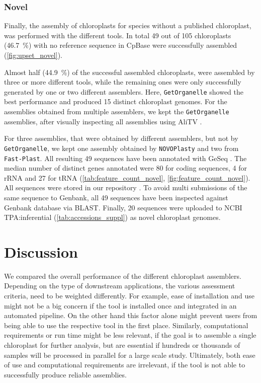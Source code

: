\documentclass{bmcart}
\newcommand{\formatprogramnames}[1]{\texttt{#1}}
\newcommand{\fp}{\formatprogramnames{Fast-Plast}}
\newcommand{\np}{\formatprogramnames{NOVOPlasty}}
\newcommand{\go}{\formatprogramnames{GetOrganelle}}
\newcommand{\zenodorepo}{\cite{zenodorepo}}
\begin{document}
\subsubsection*{Novel}
Finally, the assembly of chloroplasts for species without a published chloroplast, was performed with the different tools.
In total \num{49} out of \num{105} chloroplasts (\SI{46.7}{\percent}) with no reference sequence in CpBase were successfully assembled (\cref{fig:upset_novel}).

Almost half (\SI{44.9}{\percent}) of the successful assembled chloroplasts, were assembled by three or more different tools, while the remaining ones were only successfully generated by one or two different assemblers. 
Here, \go{} showed the best performance and produced 15 distinct chloroplast genomes. 
For the assemblies obtained from multiple assemblers, we kept the \go{} assemblies,
after visually inspecting all assemblies using AliTV \cite{alitv}.

For three assemblies, that were obtained by different assemblers, but not by \go{}, we kept one assembly obtained by \np{} and two from \fp{}.
All resulting \num{49} sequences have been annotated with GeSeq \cite{geseq}. 
The median number of distinct genes annotated were 80 for coding sequences, 4 for rRNA and 27 for tRNA (\cref{tab:feature_count_novel}, \cref{fig:feature_count_novel}). 
All sequences were stored in our repository \zenodorepo{}.
To avoid multi submissions of the same sequence to Genbank, all \num{49} sequences have been inspected against Genbank database via BLAST.
Finally, \num{20} sequences were uploaded to NCBI TPA:inferential (\cref{tab:accessions_suppl}) as novel chloroplast genomes.

\section*{Discussion}
We compared the overall performance of the different chloroplast assemblers.
Depending on the type of downstream applications, the various assessment criteria, need to be weighted differently.
For example, ease of installation and use might not be a big concern if the tool is installed once and integrated in an automated pipeline.
On the other hand this factor alone might prevent users from being able to use the respective tool in the first place.
Similarly, computational requirements or run time might be less relevant, if the goal is to assemble a single chloroplast for further analysis, but are essential if hundreds or thousands of samples will be processed in parallel for a large scale study.
Ultimately, both ease of use and computational requirements are irrelevant, if the tool is not able to successfully produce reliable assemblies.
\end{document}
